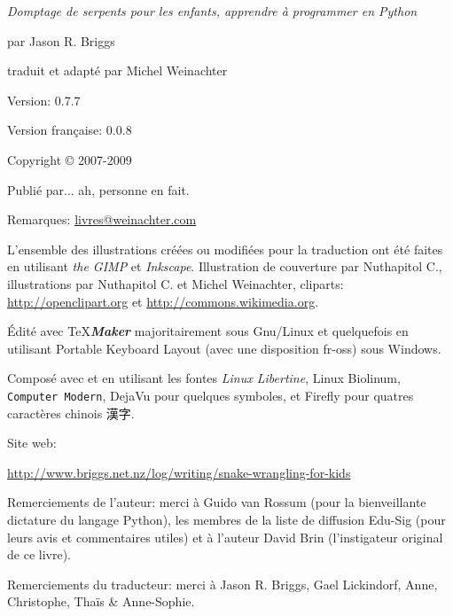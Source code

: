 \newpage

\textit{Domptage de serpents pour les enfants, apprendre à programmer en Python}

par Jason R. Briggs

traduit et adapté par Michel Weinachter

\bigskip
Version: 0.7.7

Version française: 0.0.8

\bigskip
Copyright © 2007-2009

\bigskip
Publié par... ah, personne en fait.

\bigskip
Remarques: \href{mailto:livres@weinachter.com?subject=Domptage de serpents pour les enfants}{livres@weinachter.com}

\bigskip
L'ensemble des illustrations créées ou modifiées pour la traduction ont été faites en utilisant \emph{the GIMP} et \emph{Inkscape}.
Illustration de couverture par Nuthapitol C., illustrations par Nuthapitol C. et Michel Weinachter, cliparts:
\url{http://openclipart.org} et \url{http://commons.wikimedia.org}. 

\bigskip
Édité avec \TeX{}{\textbf{\emph{Maker}}} majoritairement sous Gnu/Linux et quelquefois en utilisant Portable Keyboard Layout (avec une disposition fr-oss) sous Windows.
 
Composé avec \XeTeX{} et \XeLaTeX{} en utilisant les fontes \emph{Linux Libertine}, \textsf{Linux Biolinum}, \texttt{Computer Modern}, \setsansfont[Mapping=tex-text]{DejaVu Sans}\textsf{DejaVu} pour quelques symboles, et Firefly pour quatres caractères chinois {%
漢字}.%
 
\bigskip
Site web:

\url{http://www.briggs.net.nz/log/writing/snake-wrangling-for-kids}

\bigskip
Remerciements de l'auteur: merci à Guido van Rossum (pour la bienveillante dictature du langage Python), les membres de la liste de diffusion Edu-Sig (pour leurs avis et commentaires utiles) et à l'auteur David Brin (l'instigateur original de ce livre).

\bigskip
Remerciements du traducteur: merci à Jason R. Briggs, Gael Lickindorf, Anne, Christophe, Thaïs \& Anne-Sophie.

